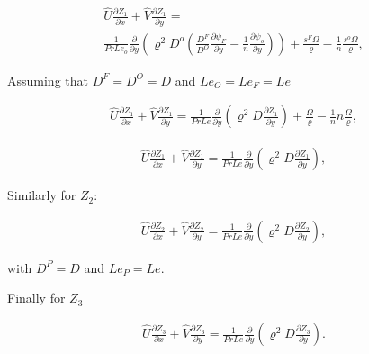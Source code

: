 \begin{equation} 
\begin{split} 
 \hat{U}\frac{\partial Z_1}{\partial x}+
 \hat{V}\frac{\partial Z_1}{\partial y}
=
\\
\frac{1}{PrLe_o}\frac{\partial}{\partial y}
\left(
       \varrho^2
       D^o
       \left(
       \frac{D^F}{D^O}
       \frac{\partial \psi_F}{\partial y}
       -
       \frac{1}{n}
       \frac{\partial \psi_o}{\partial y}
       \right)
\right)
+
\frac{s^{F}\Omega}{\varrho}
-
\frac{1}{n}
\frac{s^{o}\Omega}{\varrho}
,
\end{split} 
\end{equation} 

Assuming that $D^F=D^O=D$ 
and $Le_O=Le_F=Le$

\begin{equation} 
\begin{split} 
 \hat{U}\frac{\partial Z_1}{\partial x}+
 \hat{V}\frac{\partial Z_1}{\partial y}
=
\frac{1}{PrLe}\frac{\partial}{\partial y}
\left(
       \varrho^2
       D
       \frac{\partial Z_1 }{\partial y}
\right)
+
\frac{\Omega}{\varrho}
-
\frac{1}{n}
n
\frac{\Omega}{\varrho}
,
\end{split} 
\end{equation} 

\begin{equation} 
\begin{split} 
 \hat{U}\frac{\partial Z_1}{\partial x}+
 \hat{V}\frac{\partial Z_1}{\partial y}
=
\frac{1}{PrLe}\frac{\partial}{\partial y}
\left(
       \varrho^2
       D
       \frac{\partial Z_1 }{\partial y}
\right)
,
\end{split} 
\end{equation} 

Similarly for $Z_2$:

\begin{equation} 
\begin{split} 
 \hat{U}\frac{\partial Z_2}{\partial x}+
 \hat{V}\frac{\partial Z_2}{\partial y}
=
\frac{1}{PrLe}\frac{\partial}{\partial y}
\left(
       \varrho^2
       D
       \frac{\partial Z_2 }{\partial y}
\right)
,
\end{split} 
\end{equation} 

with  $D^P=D$  and $Le_P=Le$. 

Finally for $Z_3$

\begin{equation} 
\begin{split} 
 \hat{U}\frac{\partial Z_3}{\partial x}+
 \hat{V}\frac{\partial Z_3}{\partial y}
=
\frac{1}{PrLe}\frac{\partial}{\partial y}
\left(
       \varrho^2
       D
       \frac{\partial Z_3 }{\partial y}
\right)
.
\end{split} 
\end{equation} 

